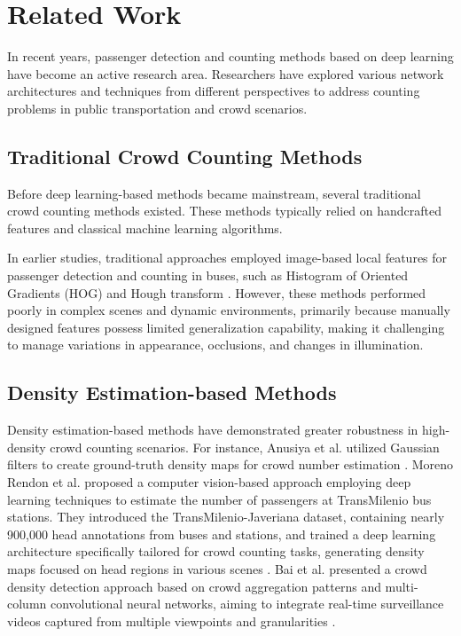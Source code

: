 \section{Related Work}\label{section::relatedwork}


In recent years, passenger detection and counting methods based on deep learning have become an active research area. Researchers have explored various network architectures and techniques from different perspectives to address counting problems in public transportation and crowd scenarios.
\subsection{Traditional Crowd Counting Methods}
Before deep learning-based methods became mainstream, several traditional crowd counting methods existed. These methods typically relied on handcrafted features and classical machine learning algorithms.

In earlier studies, traditional approaches employed image-based local features for passenger detection and counting in buses, such as Histogram of Oriented Gradients (HOG) \cite{72_beforeway} and Hough transform \cite{73_Huofu}. However, these methods performed poorly in complex scenes and dynamic environments, primarily because manually designed features possess limited generalization capability, making it challenging to manage variations in appearance, occlusions, and changes in illumination.

\subsection{Density Estimation-based Methods}
Density estimation-based methods have demonstrated greater robustness in high-density crowd counting scenarios.
For instance, Anusiya et al. utilized Gaussian filters to create ground-truth density maps for crowd number estimation \cite{71_Density_estimation_method}. Moreno Rendon et al. proposed a computer vision-based approach employing deep learning techniques to estimate the number of passengers at TransMilenio bus stations. They introduced the TransMilenio-Javeriana dataset, containing nearly 900,000 head annotations from buses and stations, and trained a deep learning architecture specifically tailored for crowd counting tasks, generating density maps focused on head regions in various scenes \cite{41_moreno_rendon_passenger_2023}. Bai et al. presented a crowd density detection approach based on crowd aggregation patterns and multi-column convolutional neural networks, aiming to integrate real-time surveillance videos captured from multiple viewpoints and granularities \cite{06_bai_crowd_2021}.

